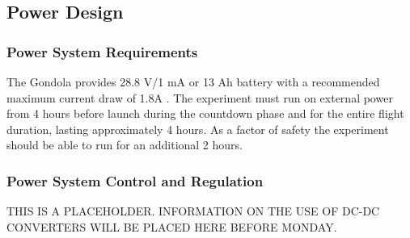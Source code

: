 \pagebreak
\subsection{Power Design}

\subsubsection{Power System Requirements}
\begin{centering}
The Gondola provides 28.8 V/1 mA or 13 Ah battery with a recommended maximum current draw of 1.8A \cite{BexusManual}. The experiment must run on external power from 4 hours before launch during the countdown phase and for the entire flight duration, lasting approximately 4 hours. As a factor of safety the experiment should be able to run for an additional 2 hours. 
\end{centering}



\subsubsection{Power System Control and Regulation}
THIS IS A PLACEHOLDER. INFORMATION ON THE USE OF DC-DC CONVERTERS WILL BE PLACED HERE BEFORE MONDAY.

\raggedbottom
